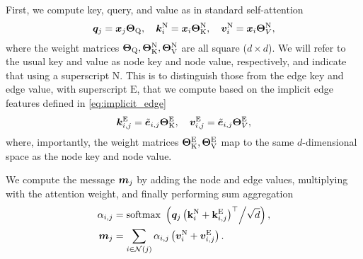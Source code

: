 \documentclass{article}
\begin{document}
First, we compute key, query, and value as in standard self-attention \citep{Vaswani2017}
\begin{equation}
    {\bm{q}}_j = {\bm{x}}_j{\bm{\Theta}}_\text{Q}, \quad {\bm{k}}_i^\text{N} = {\bm{x}}_i {\bm{\Theta}}_\text{K}^\text{N}, \quad {\bm{v}}_i^\text{N} = {\bm{x}}_i {\bm{\Theta}}_V^\text{N},
\end{equation}
where the weight matrices ${\bm{\Theta}}_\text{Q}, {\bm{\Theta}}_\text{K}^\text{N}, {\bm{\Theta}}_\text{V}^\text{N}$ are all square ($d\times d$). We will refer to the usual key and value as node key and node value, respectively, and indicate that using a superscript $\text{N}$. This is to distinguish those from the edge key and edge value, with superscript $\text{E}$, that we compute based on the implicit edge features defined in \eqref{eq:implicit_edge}
\begin{equation}
{\bm{k}}_{i,j}^\text{E} = \tilde{{\bm{e}}}_{i,j} {\bm{\Theta}}_\text{K}^\text{E}, \quad {\bm{v}}_{i,j}^\text{E} = \tilde{{\bm{e}}}_{i,j} {\bm{\Theta}}_V^\text{E},
\end{equation}
where, importantly, the weight matrices ${\bm{\Theta}}_\text{K}^\text{E}, {\bm{\Theta}}_\text{V}^\text{E}$ map to the same $d$-dimensional space as the node key and node value.

We compute the message ${\bm{m}}_j$ by adding the node and edge values, multiplying with the attention weight, and finally performing sum aggregation
\begin{align}
    \alpha_{i,j} &= \text{softmax }\left({\bm{q}}_j\left( \mathbf{k}_i^\text{N} + \mathbf{k}_{i,j}^\text{E} \right )^\top   \middle/ \sqrt{d}\right),\\
    {\bm{m}}_j &= \sum_{i\in\mathcal{N}(j)} \alpha_{i,j} \left ( {\bm{v}}_i^\text{N} + {\bm{v}}_{i,j}^\text{E}\right ).
\end{align}
\end{document}

